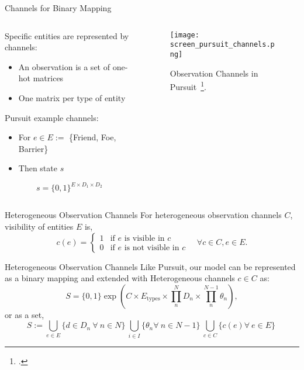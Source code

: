 \begin{frame}{Channels for Binary Mapping}
    \begin{columns}
        \begin{column}{0.6\linewidth}
            Specific entities are represented by channels:
                \begin{itemize}
                    \item An observation is a set of one-hot matrices
                    \item One matrix per type of entity
                \end{itemize}
            Pursuit example channels:
                \begin{itemize}
                    \item For \(e\in E :=\) \{Friend, Foe, Barrier\}
                    \item Then state \(s\)
                \end{itemize}
                \[s = \{0,1\}^{E\times D_1\times D_2}\]
        \end{column}
        \begin{column}{0.4\linewidth}
            \begin{figure}
                \texttt{[image: screen\_pursuit\_channels.png]}
                \caption{Observation Channels in Pursuit~\footcite{gupta2017}.}
            \end{figure}
            \centering
        \end{column}
    \end{columns}
\end{frame}

\begin{frame}{Heterogeneous Observation Channels}
    For heterogeneous observation channels \(C\),
    visibility of entities \(E\) is,
    \[
        c(e) = 
        \begin{cases}
            1& \text{if \(e\) is visible in \(c\)} \\ 
            0& \text{if \(e\) is not visible in \(c\)}
        \end{cases} 
        \quad\forall c\in C, e\in E.
    \]
\end{frame}

\begin{frame}{Heterogeneous Observation Channels}
    Like Pursuit, our model can be represented as a binary mapping
    and extended with Heterogeneous channels \(c\in C\) as:
    \[
        S = \{0,1\}\exp\left(C\times E_\text{types}
        \times \prod_{n}^{N} D_n \times \prod_{n}^{N-1} \theta_n\right),
    \]
    or as a set,
    \[
        S := \bigcup_{e \in E} \{d\in D_n\ \forall\ n\in N\}\
        \bigcup_{i \in I} \{\theta_{n} \forall\ n\in N-1\}\
        \bigcup_{c\in C} \{c(e) \forall\ e\in E\}\
    \]
\end{frame}

